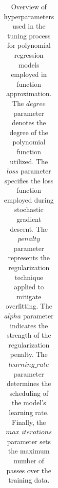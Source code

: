 \label{appendix:d}





\begin{table}[ht]
    \centering
    \caption[Hyperparameter Tuning Options for Polynomial Regression Models]{Overview of hyperparameters used in the tuning process for polynomial regression models employed in function approximation. The $degree$ parameter denotes the degree of the polynomial function utilized. The $loss$ parameter specifies the loss function employed during stochastic gradient descent. The $penalty$ parameter represents the regularization technique applied to mitigate overfitting. The $alpha$ parameter indicates the strength of the regularization penalty. The $learning\_rate$ parameter determines the scheduling of the model's learning rate. Finally, the $max\_iterations$ parameter sets the maximum number of passes over the training data.}
    \label{table:hyperparameter_tuning}
    \begin{tabular}{|c|c|}

\end{tabular}
\end{table}
